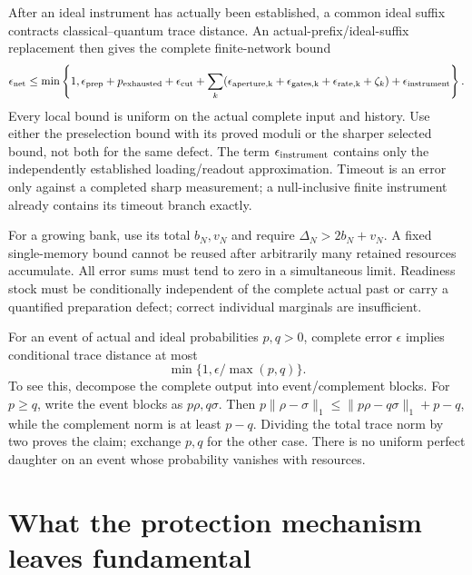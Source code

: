 \documentclass[11pt,oneside,openany]{book}
\theoremstyle{definition}
\theoremstyle{remark}\newtheorem{remark}[theorem]{Remark}
\begin{document}
After an ideal instrument has actually been established, a common ideal suffix contracts classical--quantum trace distance. An actual-prefix/ideal-suffix replacement then gives the complete finite-network bound
\begin{equation}
 \epsilon_{\rm net}\le\min\left\{1,
 \epsilon_{\rm prep}+p_{\rm exhausted}+\epsilon_{\rm cut}
 +\sum_k(\epsilon_{\rm aperture,k}+\epsilon_{\rm gates,k}
                 +\epsilon_{\rm rate,k}+\zeta_k)
 +\epsilon_{\rm instrument}\right\}.
 \label{prot:network}
\end{equation}
Every local bound is uniform on the actual complete input and history. Use either the preselection bound with its proved moduli or the sharper selected bound, not both for the same defect. The term $\epsilon_{\rm instrument}$ contains only the independently established loading/readout approximation. Timeout is an error only against a completed sharp measurement; a null-inclusive finite instrument already contains its timeout branch exactly.

For a growing bank, use its total $b_N,v_N$ and require $\Delta_N>2b_N+v_N$. A fixed single-memory bound cannot be reused after arbitrarily many retained resources accumulate. All error sums must tend to zero in a simultaneous limit. Readiness stock must be conditionally independent of the complete actual past or carry a quantified preparation defect; correct individual marginals are insufficient.

For an event of actual and ideal probabilities $p,q>0$, complete error $\epsilon$ implies conditional trace distance at most
\begin{equation}
 \min\{1,\epsilon/\max(p,q)\}.
 \label{prot:rare}
\end{equation}
To see this, decompose the complete output into event/complement blocks. For $p\ge q$, write the event blocks as $p\rho,q\sigma$. Then
$p\|\rho-\sigma\|_1\le\|p\rho-q\sigma\|_1+p-q$,
while the complement norm is at least $p-q$. Dividing the total trace norm by two proves the claim; exchange $p,q$ for the other case. There is no uniform perfect daughter on an event whose probability vanishes with resources.

\section{What the protection mechanism leaves fundamental}
\end{document}
